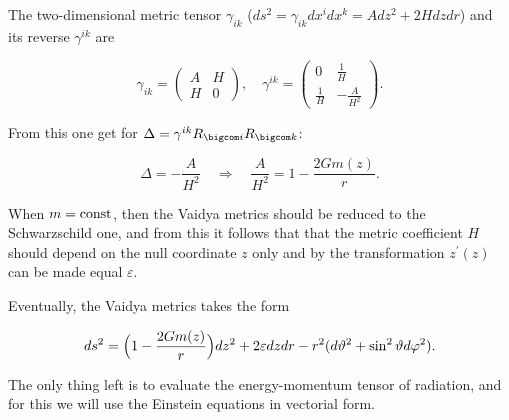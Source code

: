 The two-dimensional metric tensor $\gamma_{ik}$ ($ds^2 = \gamma_{ik} dx^i dx^k = Adz^2 + 2 H dz dr$) and its reverse $\gamma^{ik}$ are

\begin{equation}

  \gamma_{ik} = \left(

 \begin{array}{cc}

 A & H \\ H & 0

 \end{array}

 \right) , \quad 

   \gamma^{ik} = \left(

 \begin{array}{cc}

 0 & \frac{1}{H} \\ \frac{1}{H} & - \frac{A}{H^2}

 \end{array}

 \right).

\end{equation}

From this one get for $\Delta = \gamma^{ik} R_{\bigcom i} R_{\bigcom k}$:

\begin{equation}

\Delta = - \frac{A}{H^2} \quad  \Longrightarrow \quad  \frac{A}{H^2} = 1 - \frac{2 G m(z)}{r}.

\end{equation}

When $m = \rm const$, then the Vaidya metrics should be reduced to the Schwarzschild one, and from this it follows that that the metric coefficient $H$ should depend on the null coordinate $z$ only and by the transformation $z^{\prime}(z)$ can be made equal $\varepsilon$. 

Eventually, the Vaidya metrics takes the form

\begin{equation}

\label{finalfink}

ds^2 = \Bigl(1 - \frac{2 G m(z)}{r}\Bigr) dz^2 + 2 \varepsilon dz dr - r^2 (d \vartheta^2 + \sin^2{\vartheta} d \varphi^2).

\end{equation}



The only thing left is to evaluate the energy-momentum tensor of radiation, and for this we will use the Einstein equations in vectorial form. 

